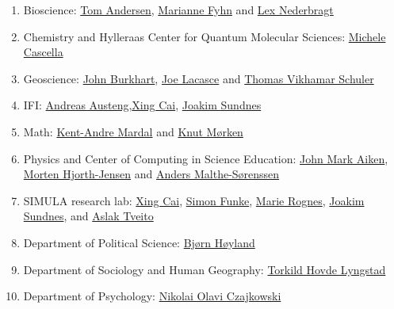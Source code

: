 \documentclass[%
oneside,                 %
final,                   %
10pt]{article}
\begin{document}
\begin{enumerate}
\item Bioscience: \href{{http://www.mn.uio.no/ibv/english/people/aca/tomand/}}{Tom Andersen}, \href{{http://www.mn.uio.no/ibv/english/people/aca/mariafy/}}{Marianne Fyhn} and \href{{http://www.mn.uio.no/cees/english/people/technical/alexajo/}}{Lex Nederbragt}

\item Chemistry and Hylleraas Center for Quantum Molecular Sciences: \href{{https://www.mn.uio.no/kjemi/english/people/aca/michelec/}}{Michele Cascella}

\item Geoscience: \href{{http://www.mn.uio.no/geo/english/people/aca/geohyd/johnbur/index.html}}{John Burkhart}, \href{{http://www.mn.uio.no/geo/english/people/aca/metos/josepl/}}{Joe Lacasce} and \href{{http://www.mn.uio.no/geo/english/people/aca/geohyd/thomasc/}}{Thomas Vikhamar Schuler}

\item IFI: \href{{https://www.mn.uio.no/ifi/personer/vit/andrea/}}{Andreas Austeng},\href{{http://www.mn.uio.no/ifi/personer/vit/xingca/index.html}}{Xing Cai}, \href{{http://www.mn.uio.no/ifi/english/people/aca/sundnes/index.html}}{Joakim Sundnes}

\item Math: \href{{https://folk.uio.no/kent-and/}}{Kent-Andre Mardal} and \href{{http://www.mn.uio.no/math/personer/vit/knutm/index.html}}{Knut Mørken}

\item Physics and Center of Computing in Science Education: \href{{http://www.mn.uio.no/fysikk/english/people/johnmai/}}{John Mark Aiken}, \href{{http://mhjgit.github.io/info/doc/web/}}{Morten Hjorth-Jensen} and  \href{{http://www.mn.uio.no/fysikk/english/people/aca/malthe/}}{Anders Malthe-Sørenssen}

\item SIMULA research lab: \href{{http://www.mn.uio.no/ifi/personer/vit/xingca/index.html}}{Xing Cai}, \href{{https://www.simula.no/people/simon}}{Simon Funke}, \href{{https://marierognes.org/}}{Marie Rognes}, \href{{http://www.mn.uio.no/ifi/english/people/aca/sundnes/index.html}}{Joakim Sundnes}, and \href{{https://www.simula.no/people/aslak}}{Aslak Tveito}

\item Department of Political Science: \href{{http://www.sv.uio.no/isv/personer/vit/bjornkho/}}{Bjørn Høyland}

\item Department of Sociology and Human Geography: \href{{http://www.sv.uio.no/iss/english/people/aca/torkildl/}}{Torkild Hovde Lyngstad}

\item Department of Psychology: \href{{http://www.sv.uio.no/psi/english/people/aca/nikolaic/index.html}}{Nikolai Olavi Czajkowski}
\end{enumerate}
\end{document}
